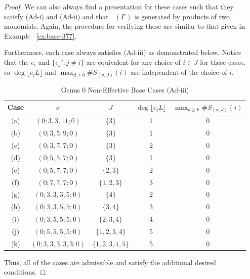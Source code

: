\documentclass{amsart}
\theoremstyle{plain}
\theoremstyle{definition}
\theoremstyle{remark}
\numberwithin{equation}{section}
\DeclareMathOperator{\initial}{in_\prec}
\begin{document}
\begin{proof}
We can also always find a presentation for these cases such that
they satisfy (Ad-i) and (Ad-ii) and that $\initial(I')$ is
generated by products of two monomials. Again, the procedure for
verifying these are similar to that given in Example
~\ref{ex:base-377}.

Furthermore, each case always satisfies (Ad-iii) as demonstrated below.
Notice that the $e_i$ and $\{e_j' : j \neq i\}$ are equivalent
for any choice of $i \in J$ for these cases, so $\deg \lfloor e_i L
\rfloor$ and $\max_{d \geq 0} \#S_{(\sigma, J)}(i)$ are
independent of the choice of $i$.

\begin{longtable}
	{| c | c | c || c | c |}
	\caption{Genus 0 Non-Effective Base Cases (Ad-iii)}
	\label{table:g-0-base-cases-admissibility}
	
	\tabularnewline
	
	\hline
	Case & $\sigma$ & $J$ & $\deg \lfloor e_i L \rfloor$ &
	$\max_{d \geq 0} \#S_{(\sigma, J)}(i)$ \\
	\hline
	\hline

	(a) & $(0; 3, 3, 11; 0)$ & $\{3\}$ & 1 & 0 \\	\hline
	
	(b) & $(0; 3, 5, 9; 0)$ & $\{3\}$ & 1 & 0 \\ \hline
	
	(c) & $(0; 3, 7, 7; 0)$ & $\{3\}$ & 2 & 0 \\ \hline
	
	(d) & $(0; 5, 5, 7; 0)$ & $\{3\}$ & 1 & 0 \\ \hline
	
	(e) & $(0; 5, 7, 7; 0)$ & $\{2, 3\}$ & 2 & 0 \\ \hline

	(f) & $(0; 7, 7, 7; 0)$ & $\{1, 2, 3\}$ & 3 & 0 \\ \hline

	(g) & $(0; 3, 3, 3, 5; 0)$ & $\{4\}$ & 2 & 0 \\ \hline
	
	(h) & $(0; 3, 3, 5, 5; 0)$ & $\{3, 4\}$ & 3 & 0 \\ \hline
	
	(i) & $(0; 3, 5, 5, 5; 0)$ & $\{2, 3, 4\}$ & 4 & 0 \\ \hline
	
	(j) & $(0; 5, 5, 5, 5; 0)$ & $\{1, 2, 3, 4\}$ & 5 & 0 \\ \hline

	(k) & $(0; 3, 3, 3, 3, 3; 0)$ & $\{1, 2, 3, 4, 5\}$ & 5 & 0 \\ \hline
\end{longtable}

Thus, all of the cases are admissible and satisfy the additional
desired conditions.
\end{proof}
\end{document}
